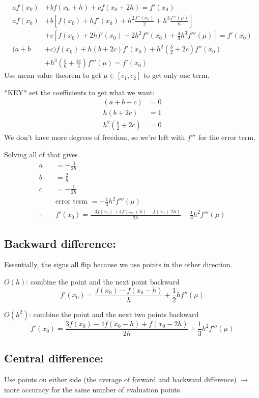 \documentclass[12pt]{article}
\begin{document}
\begin{align*}
a f(x_0) &+ b f(x_0 + h) + c f(x_0 + 2h) = f'(x_0) \\
%
a f(x_0) &+ b[f(x_0) + hf'(x_0) + h^2\frac{f''(x_0)}{2} + h^3\frac{f'''(\mu)}{6}] \nonumber \\
&+ c[f(x_0) + 2h f'(x_0) + 2 h^2 f''(x_0) + \frac{4}{3} h^3 f'''(\mu)] =f'(x_0)\\
(a + b &+ c)f(x_0) + h(b + 2c)f'(x_0) + h^2(\frac{b}{2} + 2c) f''(x_0) \\
&+ h^3(\frac{b}{6} +  \frac{4c}{3}) f'''(\mu) = f'(x_0)
\end{align*}
%
Use mean value theorem to get $\mu \in [c_1, c_2]$ to get only one term.

*KEY* set the coefficients to get what we want:
%
\begin{align*}
(a + b + c) &= 0\\
h(b + 2c) &= 1\\
h^2(\frac{b}{2} + 2c) &= 0
\end{align*}
%
We don't have more degrees of freedom, so we're left with $f'''$ for the error term. 

Solving all of that gives
%
\begin{align*}
a &= -\frac{3}{2h} \\
b &= \frac{2}{h} \\
c &= -\frac{1}{2h} \\
&\text{error term } = -\frac{1}{3}h^2 f'''(\mu) \\
\therefore \quad &\boxed{f'(x_0) = \frac{-3 f(x_0) + 4f(x_0 + h) - f(x_0 + 2h)}{2h} -\frac{1}{3}h^2 f'''(\mu)}
\end{align*}


\subsection*{Backward difference:}
Essentially, the signs all flip because we use points in the other direction.

\underline{$O(h)$}: combine the point and the next point backward
\[f'(x_0) = \frac{f(x_0) - f(x_0 - h)}{h} + \frac{1}{2}hf''(\mu)\]

\underline{$O(h^2)$}: combine the point and the next two points backward
%
\[f'(x_0) = \frac{3 f(x_0) - 4f(x_0 - h) + f(x_0 - 2h)}{2h} + \frac{1}{3}h^2 f'''(\mu)\]

\subsection*{Central difference:}
Use points on either side (the average of forward and backward difference) $\rightarrow$ more accuracy for the same number of evaluation  points.
\end{document}
